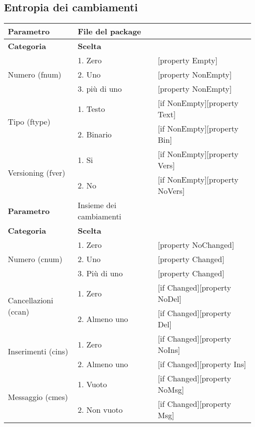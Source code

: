 \clearpage

\subsection{Entropia dei cambiamenti}
		
		
		\begin{table}[ht]
		\footnotesize
		\centering
			\begin{tabular}{|p{4cm}|p{4cm}p{5cm}|}
				\hline
				\cellcolor{Gray} \textbf{Parametro}		& File del package	&											\tabularnewline
				\hline
				\rowcolor{Gray}
				\textbf{Categoria} 						& \textbf{Scelta}			&									\tabularnewline
				\hline
				\multirow{3}{*}{Numero (fnum)} 			& 1. Zero 					&	[property Empty] 				\tabularnewline
				\cline{2-3}
														& 2. Uno 					&	[property NonEmpty]				\tabularnewline
				\cline{2-3}
														& 3. più di uno 			&	[property NonEmpty]				\tabularnewline
				\hline
				\multirow{2}{*}{Tipo (ftype)} 			& 1. Testo					&	[if NonEmpty][property Text] 	\tabularnewline
				\cline{2-3}
														& 2. Binario				&	[if NonEmpty][property Bin]		\tabularnewline
				\hline
				\multirow{2}{*}{Versioning (fver)}		& 1. Si						&	[if NonEmpty][property Vers]	\tabularnewline
				\cline{2-3}
														& 2. No						&	[if NonEmpty][property NoVers]	\tabularnewline
				\hline
				
				
				\cellcolor{Gray} \textbf{Parametro}		& Insieme dei cambiamenti	&									\tabularnewline
				\hline
				\rowcolor{Gray}
				\textbf{Categoria} 						& \textbf{Scelta}			&									\tabularnewline
				\hline
				\multirow{3}{*}{Numero (cnum)} 			& 1. Zero 					&	[property NoChanged]			\tabularnewline
				\cline{2-3}
														& 2. Uno					&	[property Changed]				\tabularnewline
				\cline{2-3}
														& 3. Più di uno				&	[property Changed]				\tabularnewline
				\hline
				\multirow{2}{*}{Cancellazioni (ccan)} 	& 1. Zero	 				&	[if Changed][property NoDel] 	\tabularnewline
				\cline{2-3}
														& 2. Almeno uno				&	[if Changed][property Del]		\tabularnewline
				\hline
				\multirow{2}{*}{Inserimenti (cins)} 	& 1. Zero 					&	[if Changed][property NoIns] 	\tabularnewline
				\cline{2-3}
														& 2. Almeno uno 			&	[if Changed][property Ins]		\tabularnewline
				\hline
				\multirow{2}{*}{Messaggio (cmes)} 		& 1. Vuoto 					&	[if Changed][property NoMsg] 	\tabularnewline
				\cline{2-3}
														& 2. Non vuoto 				&	[if Changed][property Msg]		\tabularnewline
				\hline			
				

\end{tabular}
\end{table}
